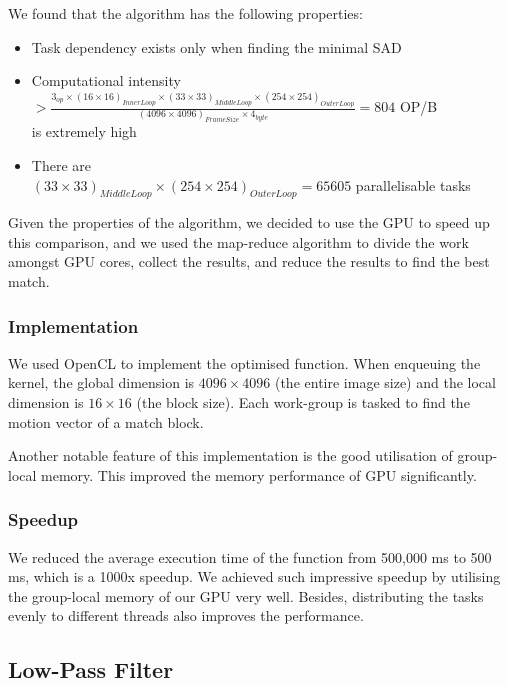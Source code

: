 \documentclass[a4paper]{article}
\begin{document}
We found that the algorithm has the following properties:
\begin{itemize}
\item Task dependency exists only when finding the minimal SAD
\item Computational intensity \\
  \(> \frac{3_{op} \times (16 \times 16)_{InnerLoop} \times (33 \times 33)_{MiddleLoop} \times
    (254 \times 254)_{OuterLoop}}{(4096 \times 4096)_{FrameSize} \times 4_{byte}} =
  804\) OP/B \\
  is extremely high
\item There are \\
  \((33 \times 33)_{MiddleLoop} \times (254 \times 254)_{OuterLoop} = 65605\)
  parallelisable tasks
\end{itemize}

Given the properties of the algorithm, we decided to use the GPU to
speed up this comparison, and we used the map-reduce algorithm to
divide the work amongst GPU cores, collect the results, and reduce the
results to find the best match.

\subsubsection{Implementation}
We used OpenCL to implement the optimised function. When enqueuing the
kernel, the global dimension is \(4096 \times 4096\) (the entire image
size) and the local dimension is \(16 \times 16\) (the block size). Each
work-group is tasked to find the motion vector of a match block.

Another notable feature of this implementation is the good utilisation
of group-local memory. This improved the memory performance of GPU
significantly.



\subsubsection{Speedup}
We reduced the average execution time of the function from 500,000 ms
to 500 ms, which is a 1000x speedup. We achieved such impressive
speedup by utilising the group-local memory of our GPU very well.
Besides, distributing the tasks evenly to different threads also improves
the performance.

\subsection{Low-Pass Filter}
\end{document}
